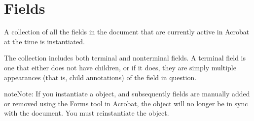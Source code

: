 \documentclass[letterpaper,12pt,english,openany,oneside]{sphinxmanual}
\begin{document}
\begin{sphinxVerbatim}[commandchars=\\\{\}]
   
  
  
 
  
\end{sphinxVerbatim}


\section{Fields}
\label{\detokenize{IAC_API_FormsIntro:fields}}
A collection of all the fields in the document that are currently active in Acrobat at the time  is instantiated.

The  collection includes both terminal and non\sphinxhyphen{}terminal fields. A terminal field is one that either does not have children, or if it does, they are simply multiple appearances (that is, child annotations) of the field in question.

\begin{sphinxadmonition}{note}{Note:}
If you instantiate a  object, and subsequently fields are manually added or removed using the Forms tool in Acrobat, the  object will no longer be in sync with the document. You must re\sphinxhyphen{}instantiate the  object.
\end{sphinxadmonition}
\end{document}
